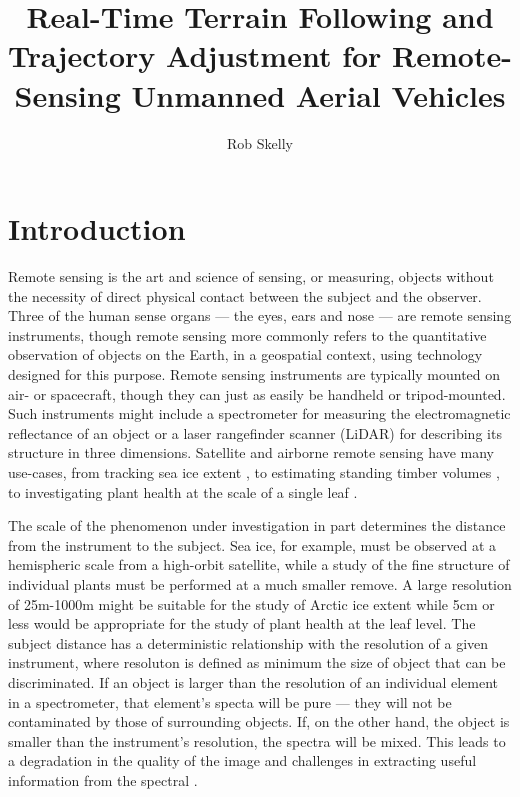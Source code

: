 \documentclass[10pt,a4paper]{report}
\author{Rob Skelly}
\title{Real-Time Terrain Following and Trajectory Adjustment for Remote-Sensing Unmanned Aerial Vehicles}
\begin{document}
\maketitle

\doublespace

\section{Introduction}

Remote sensing is the art and science of sensing, or measuring, objects without the necessity of direct physical contact between the subject and the observer. Three of the human sense organs --- the eyes, ears and nose --- are remote sensing instruments, though remote sensing more commonly refers to the quantitative observation of objects on the Earth, in a geospatial context, using technology designed for this purpose. Remote sensing instruments are typically mounted on air- or spacecraft, though they can just as easily be handheld or tripod-mounted. Such instruments might include a spectrometer for measuring the electromagnetic reflectance of an object or a laser rangefinder scanner (LiDAR) for describing its structure in three dimensions. Satellite and airborne remote sensing have many use-cases, from tracking sea ice extent \cite{Dierking2006,Shuchman2004}, to estimating standing timber volumes \cite{Allouis2011,Tonolli2011}, to investigating plant health at the scale of a single leaf \cite{Palou2013}.

The scale of the phenomenon under investigation in part determines the distance from the instrument to the subject. Sea ice, for example, must be observed at a hemispheric scale from a high-orbit satellite, while a study of the fine structure of individual plants must be performed at a much smaller remove. A large resolution of 25m-1000m \cite{Shuchman2004} might be suitable for the study of Arctic ice extent while 5cm or less \cite{Palou2013} would be appropriate for the study of plant health at the leaf level. The subject distance has a deterministic relationship with the resolution of a given instrument, where resoluton is defined as minimum the size of object that can be discriminated. If an object is larger than the resolution of an individual element in a spectrometer, that element's specta will be pure --- they will not be contaminated by those of surrounding objects. If, on the other hand, the object is smaller than the instrument's resolution, the spectra will be mixed. This leads to a degradation in the quality of the image and challenges in extracting useful information from the spectral \cite{Lillesand1999}. 
\end{document}
